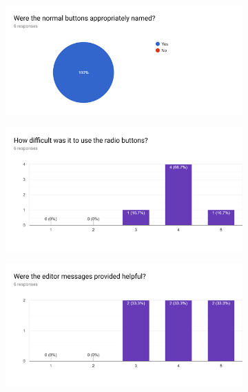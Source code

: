 \documentclass{l4proj}
\begin{document}
\begin{appendices}
\begin{figure}[H]
\centering
\begin{subfigure}[b]{\textwidth}
\centering
\includegraphics[width=\textwidth]{A1/11.png}
\end{subfigure}
\end{figure}

\begin{figure}[H]
\centering
\begin{subfigure}[b]{\textwidth}
\centering
\includegraphics[width=\textwidth]{A1/12.png}
\end{subfigure}
\end{figure}

\begin{figure}[H]
\centering
\begin{subfigure}[b]{\textwidth}
\centering
\includegraphics[width=\textwidth]{A1/13.png}
\end{subfigure}
\end{figure}


\end{appendices}
\end{document}
